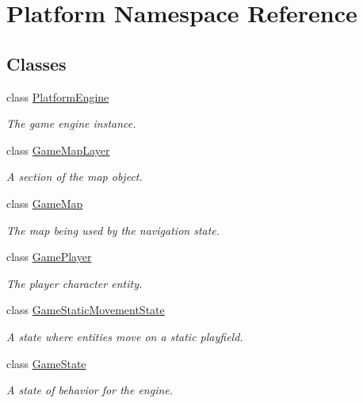 \hypertarget{namespace_platform}{
\section{Platform Namespace Reference}
\label{dc/d0e/namespace_platform}
}
\subsection*{Classes}
\begin{CompactItemize}
\item 
class \hyperlink{class_platform_1_1_platform_engine}{PlatformEngine}
\begin{CompactList}\small\item\em The game engine instance. \item\end{CompactList}\item 
class \hyperlink{class_platform_1_1_game_map_layer}{GameMapLayer}
\begin{CompactList}\small\item\em A section of the map object. \item\end{CompactList}\item 
class \hyperlink{class_platform_1_1_game_map}{GameMap}
\begin{CompactList}\small\item\em The map being used by the navigation state. \item\end{CompactList}\item 
class \hyperlink{class_platform_1_1_game_player}{GamePlayer}
\begin{CompactList}\small\item\em The player character entity. \item\end{CompactList}\item 
class \hyperlink{class_platform_1_1_game_static_movement_state}{GameStaticMovementState}
\begin{CompactList}\small\item\em A state where entities move on a static playfield. \item\end{CompactList}\item 
class \hyperlink{class_platform_1_1_game_state}{GameState}
\begin{CompactList}\small\item\em A state of behavior for the engine. \item\end{CompactList}\end{CompactItemize}
